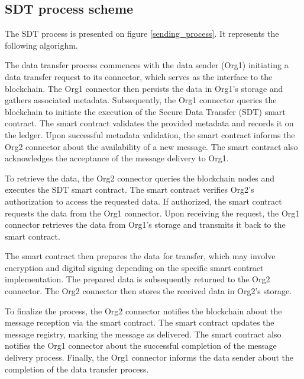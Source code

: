 \documentclass[10pt]{llncs}
\begin{document}
\subsection{SDT process scheme}

The SDT process is presented on figure \ref{sending_process}.
It represents the following algorighm.

The data transfer process commences with the data sender (Org1) initiating a data transfer request to its connector, which serves as the interface to the blockchain. 
The Org1 connector then persists the data in Org1's storage and gathers associated metadata. 
Subsequently, the Org1 connector queries the blockchain to initiate the execution of the Secure Data Transfer (SDT) smart contract. 
The smart contract validates the provided metadata and records it on the ledger. 
Upon successful metadata validation, the smart contract informs the Org2 connector about the availability of a new message. 
The smart contract also acknowledges the acceptance of the message delivery to Org1.

To retrieve the data, the Org2 connector queries the blockchain nodes and executes the SDT smart contract. 
The smart contract verifies Org2's authorization to access the requested data. 
If authorized, the smart contract requests the data from the Org1 connector. 
Upon receiving the request, the Org1 connector retrieves the data from Org1's storage and transmits it back to the smart contract.

The smart contract then prepares the data for transfer, which may involve encryption and digital signing depending on the specific smart contract implementation. 
The prepared data is subsequently returned to the Org2 connector. The Org2 connector then stores the received data in Org2's storage.

To finalize the process, the Org2 connector notifies the blockchain about the message reception via the smart contract. 
The smart contract updates the message registry, marking the message as delivered. 
The smart contract also notifies the Org1 connector about the successful completion of the message delivery process. 
Finally, the Org1 connector informs the data sender about the completion of the data transfer process.
\end{document}
